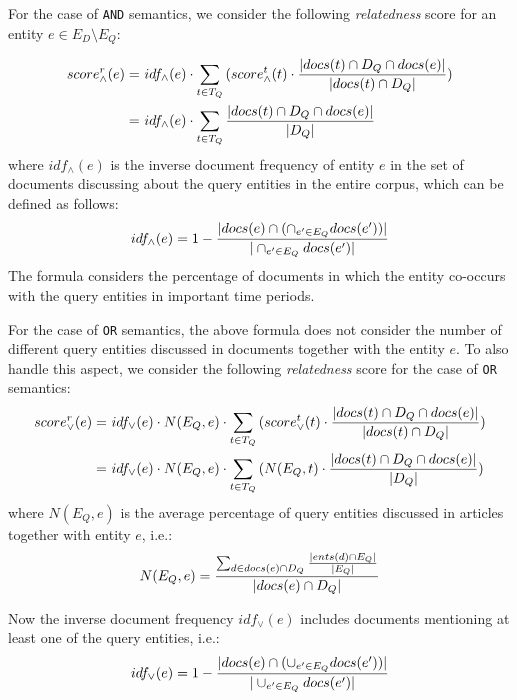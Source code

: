 For the case of {\tt AND} semantics,
we consider the following {\em relatedness} score
for an entity $e \in E_D \setminus E_Q$:

\begin{equation}
\begin{split}
\small
score^{r}_\wedge(e) = & ~ idf_\wedge(e) \cdot \sum_{t \in T_Q}{(score^{t}_\wedge(t) \cdot \frac{|docs(t) \cap D_Q \cap docs(e)|}{|docs(t) \cap D_Q|})}\\
= & ~ idf_\wedge(e) \cdot \sum_{t \in T_Q}{\frac{|docs(t) \cap D_Q \cap docs(e)|}{|D_Q|}}
\end{split}
\end{equation}
where $idf_\wedge(e)$ is the inverse document frequency
of entity $e$ in the set of documents discussing about the query entities in the entire corpus,
which can be defined as follows:
\begin{equation}
\label{frml:idf_and}
\small
idf_\wedge(e) = 1 - \frac{|docs(e) \cap (\cap_{e' \in E_Q}{docs(e')})|}{|\cap_{e' \in E_Q}{docs(e')}|}
\end{equation}
The formula considers the percentage of
documents in which the entity
co-occurs with the query entities in important time periods.

For the case of {\tt OR} semantics,
the above formula does not consider the
number of different query entities discussed in documents together with the entity $e$.
To also handle this aspect,
we consider the following {\em relatedness} score for the case of {\tt OR} semantics:
\begin{equation}
\begin{split}
\small
score^{r}_\vee(e) =  & ~ idf_\vee(e) \cdot  N(E_Q, e) \cdot \sum_{t \in T_Q}{(score^{t}_\vee(t) \cdot \frac{|docs(t) \cap D_Q \cap docs(e)|}{|docs(t) \cap D_Q|})} \\
= & ~ idf_\vee(e) \cdot N(E_Q, e) \cdot  \sum_{t \in T_Q}{(N(E_Q, t)\cdot \frac{|docs(t) \cap D_Q \cap docs(e)|}{|D_Q|})}
\end{split}
\end{equation}
where $N(E_Q, e)$ is
the average percentage of query entities discussed in articles together with entity $e$, i.e.:
\begin{equation}
\small
N(E_Q, e) =  \frac{\sum_{d \in docs(e) \cap D_Q}{\frac{|ents(d) \cap E_Q|}{|E_Q|}}}{|docs(e) \cap D_Q|}
\end{equation}

Now the inverse document frequency $idf_\vee(e)$
includes documents mentioning at least one of the query entities, i.e.:
\begin{equation}
\label{frml:idf_or}
\small
idf_\vee(e) = 1 - \frac{|docs(e) \cap (\cup_{e' \in E_Q}{docs(e')})|}{|\cup_{e' \in E_Q}{docs(e')}|}
\end{equation}


